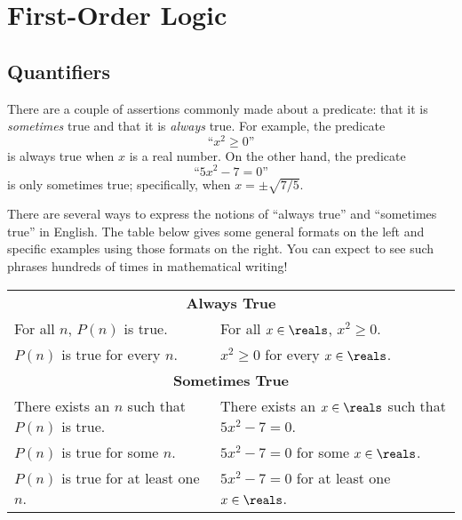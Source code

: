 \chapter{First-Order Logic}

\newcommand{\solves}{\text{Solves}}
\newcommand{\probs}{\text{Probs}}
\newcommand{\even}{\text{Evens}}
\newcommand{\primes}{\text{Primes}}

\section{Quantifiers}

There are a couple of assertions commonly made about a predicate: that it
is \emph{sometimes} true and that it is \emph{always} true.  For
example, the predicate
%
\[
\text{``$x^2 \geq 0$''}
\]
%
is always true when $x$ is a real number.  On the other hand, the
predicate
%
\[
\text{``$5x^2 - 7 = 0$''}
\]
%
is only sometimes true; specifically, when $x = \pm \sqrt{7/5}$.

There are several ways to express the notions of ``always true'' and
``sometimes true'' in English.  The table below gives some general
formats on the left and specific examples using those formats on the
right.  You can expect to see such phrases hundreds of times in
mathematical writing!
%
\begin{center}
\begin{tabular}{ll}
\multicolumn{2}{c}{\textbf{Always True}} \\[1ex]
For all $n$, $P(n)$ is true. & For all $x \in \reals$, $x^2 \geq 0$. \\
$P(n)$ is true for every $n$. & $x^2 \geq 0$ for every $x \in \reals$. \\[2ex]
\multicolumn{2}{c}{\textbf{Sometimes True}} \\[1ex]
There exists an $n$ such that $P(n)$ is true. & There exists an $x \in \reals$ such that $5x^2 - 7 = 0$.\\
$P(n)$ is true for some $n$. & $5x^2 - 7 = 0$ for some $x \in \reals$.\\
$P(n)$ is true for at least one $n$. & $5x^2-7=0$ for at least one $x \in \reals$.
\end{tabular}
\end{center}


